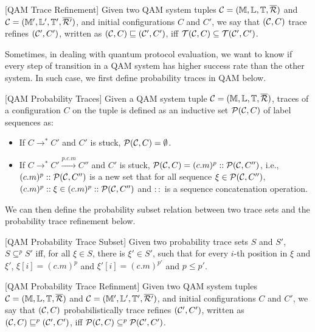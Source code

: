 \begin{definition}\label{def:traceeq}\rm[QAM Trace Refinement]
Given two QAM system tuples $\mathcal{C}=(\mathbb{M},\mathbb{L},\mathbb{T},\overline{\mathcal{R}})$ and $\mathcal{C}=(\mathbb{M}',\mathbb{L}',\mathbb{T}',\overline{\mathcal{R}'})$, and initial configurations $C$ and $C'$,  we say that $(\mathcal{C},C)$ trace refines $(\mathcal{C}',C')$, written as $(\mathcal{C},C) \sqsubseteq (\mathcal{C}',C')$, iff $\mathcal{T}(\mathcal{C},C)\subseteq \mathcal{T}(\mathcal{C}',C')$.

\end{definition}

Sometimes, in dealing with quantum protocol evaluation, we want to know if every step of transition in a QAM system has higher success rate than the other system. In such case, we first define probability traces in QAM below.

\begin{definition}\label{def:ptraces}\rm[QAM Probability Traces]
Given a QAM system tuple $\mathcal{C}=(\mathbb{M},\mathbb{L},\mathbb{T},\overline{\mathcal{R}})$, traces of a configuration $C$ on the tuple is defined as an inductive set $\mathcal{P}(\mathcal{C},C)$ of label sequences as:

\begin{itemize}
\item If $C \longrightarrow^* C'$ and $C'$ is stuck, $\mathcal{P}(\mathcal{C},C)=\emptyset$.
\item If $C \longrightarrow^* C' \xrightarrow{p.c.m} C''$ and $C'$ is stuck, $\mathcal{P}(\mathcal{C},C)=(c.m)^p::\mathcal{P}(\mathcal{C},C'')$, i.e., $(c.m)^p::\mathcal{P}(\mathcal{C},C'')$ is a new set that for all sequence $\xi \in \mathcal{P}(\mathcal{C},C'')$, $(c.m)^p::\xi \in (c.m)^p::\mathcal{P}(\mathcal{C},C'')$ and $::$ is a sequence concatenation operation.
\end{itemize}
\end{definition}

We can then define the probability subset relation between two trace sets and the probability trace refinement below.

\begin{definition}\label{def:ptracesub}\rm[QAM Probability Trace Subset]
Given two probability trace sets $S$ and $S'$, $S \subseteq^p S'$ iff, for all $\xi \in S$, there is $\xi' \in S'$, such that for every $i$-th position in $\xi$ and $\xi'$, $\xi[i]=(c.m)^p$ and $\xi'[i]=(c.m)^{p'}$ and $p \le p'$.

\end{definition}

\begin{definition}\label{def:ptracerefine}\rm[QAM Probability Trace Refinment]
Given two QAM system tuples $\mathcal{C}=(\mathbb{M},\mathbb{L},\mathbb{T},\overline{\mathcal{R}})$ and $\mathcal{C}=(\mathbb{M}',\mathbb{L}',\mathbb{T}',\overline{\mathcal{R}'})$, and initial configurations $C$ and $C'$,  we say that $(\mathcal{C},C)$ probabilistically trace refines $(\mathcal{C}',C')$, written as $(\mathcal{C},C) \sqsubseteq^p (\mathcal{C}',C')$, iff $\mathcal{P}(\mathcal{C},C)\subseteq^p \mathcal{P}(\mathcal{C}',C')$.

\end{definition}




